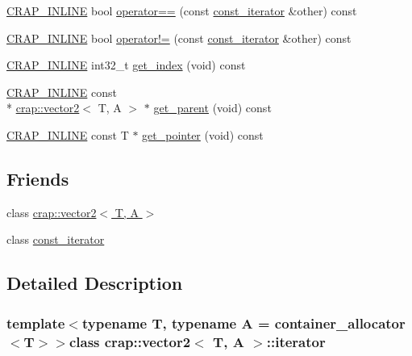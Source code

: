 \begin{DoxyCompactItemize}
\item 
\hyperlink{config__x86_8h_a5a40526b8d842e7ff731509998bb0f1c}{C\+R\+A\+P\+\_\+\+I\+N\+L\+I\+N\+E} bool \hyperlink{classcrap_1_1vector2_1_1iterator_a9f0f8c93d2b1fa1b32bd581be67075ae}{operator==} (const \hyperlink{classcrap_1_1vector2_1_1const__iterator}{const\+\_\+iterator} \&other) const 
\item 
\hyperlink{config__x86_8h_a5a40526b8d842e7ff731509998bb0f1c}{C\+R\+A\+P\+\_\+\+I\+N\+L\+I\+N\+E} bool \hyperlink{classcrap_1_1vector2_1_1iterator_a6ca15b7142a8f1b1b93b9af1e8b1d786}{operator!=} (const \hyperlink{classcrap_1_1vector2_1_1const__iterator}{const\+\_\+iterator} \&other) const 
\item 
\hyperlink{config__x86_8h_a5a40526b8d842e7ff731509998bb0f1c}{C\+R\+A\+P\+\_\+\+I\+N\+L\+I\+N\+E} int32\+\_\+t \hyperlink{classcrap_1_1vector2_1_1iterator_ae57eeba33f8ea104658e0f49b03dea68}{get\+\_\+index} (void) const 
\item 
\hyperlink{config__x86_8h_a5a40526b8d842e7ff731509998bb0f1c}{C\+R\+A\+P\+\_\+\+I\+N\+L\+I\+N\+E} const \\*
\hyperlink{classcrap_1_1vector2}{crap\+::vector2}$<$ T, A $>$ $\ast$ \hyperlink{classcrap_1_1vector2_1_1iterator_aca4512f23e4ec0b78c39b19c3125ae8c}{get\+\_\+parent} (void) const 
\item 
\hyperlink{config__x86_8h_a5a40526b8d842e7ff731509998bb0f1c}{C\+R\+A\+P\+\_\+\+I\+N\+L\+I\+N\+E} const T $\ast$ \hyperlink{classcrap_1_1vector2_1_1iterator_ad1b7326308bff21e9417c442d26717f9}{get\+\_\+pointer} (void) const 
\end{DoxyCompactItemize}
\subsection*{Friends}
\begin{DoxyCompactItemize}
\item 
class \hyperlink{classcrap_1_1vector2_1_1iterator_a142d8169185e0b8e0853b453e03d366f}{crap\+::vector2$<$ T, A $>$}
\item 
class \hyperlink{classcrap_1_1vector2_1_1iterator_ac220ce1c155db1ac44146c12d178056f}{const\+\_\+iterator}
\end{DoxyCompactItemize}


\subsection{Detailed Description}
\subsubsection*{template$<$typename T, typename A = container\+\_\+allocator$<$\+T$>$$>$class crap\+::vector2$<$ T, A $>$\+::iterator}



